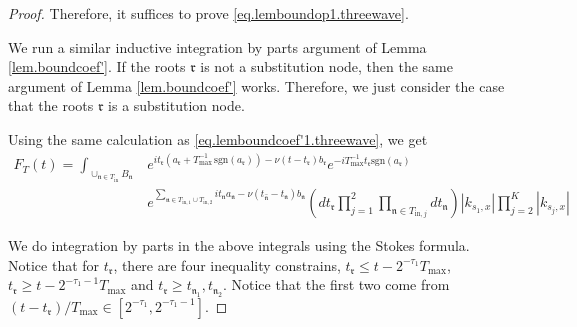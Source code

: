 \begin{proof}
Therefore, it suffices to prove \eqref{eq.lemboundop1.threewave}.

We run a similar inductive integration by parts argument of Lemma \ref{lem.boundcoef'}. If the roots $\mathfrak{r}$ is not a substitution node, then the same argument of Lemma \ref{lem.boundcoef'} works. Therefore, we just consider the case that the roots $\mathfrak{r}$ is a substitution node. 

Using the same calculation as \eqref{eq.lemboundcoef'1.threewave}, we get 
\begin{equation}
\begin{split}
    F_{T}(t)=\int_{\cup_{\mathfrak{n}\in T_{\text{in}}} B_{\mathfrak{n}}}&e^{it_{\mathfrak{r}}(a_{\mathfrak{r}}+T^{-1}_{\text{max}}\, \text{sgn}(a_{\mathfrak{r}}))- \nu(t-t_{\mathfrak{r}})b_{\mathfrak{r}}} e^{-iT^{-1}_{\text{max}}t_{\mathfrak{r}} \text{sgn}(a_{\mathfrak{r}})} 
    \\
    &e^{\sum_{\mathfrak{n}\in T_{\text{in},1}\cup T_{\text{in},2}} it_{\mathfrak{n}} a_{\mathfrak{n}} - \nu(t_{\widehat{\mathfrak{n}}}-t_{\mathfrak{n}})b_{\mathfrak{n}}}  \left(dt_{\mathfrak{r}}\prod_{j=1}^2\prod_{\mathfrak{n}\in T_{\text{in},j}}dt_{\mathfrak{n}}  \right)|k_{s_1,x}|\prod^K_{j=2}|k_{s_j,x}|
\end{split}
\end{equation}



We do integration by parts in the above integrals using the Stokes formula. Notice that for $t_{\mathfrak{r}}$, there are four inequality constrains, $t_{\mathfrak{r}}\le t-2^{-\tau_{1}}T_{\text{max}}$, $t_{\mathfrak{r}}\ge t-2^{-\tau_{1}-1}T_{\text{max}}$ and $t_{\mathfrak{r}}\ge t_{\mathfrak{n}_1},t_{\mathfrak{n}_2}$. Notice that the first two come from $(t-t_{\mathfrak{r}})/T_{\text{max}}\in [2^{-\tau_{1}},2^{-\tau_{1}-1}]$.



\end{proof}
